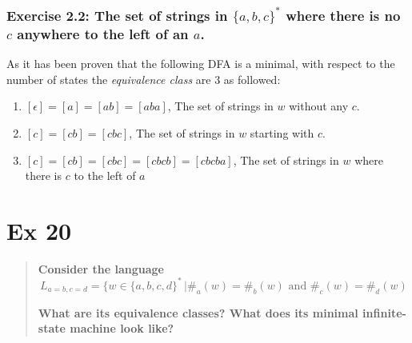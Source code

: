 \documentclass[titlepage]{article}\usepackage[]{graphicx}\usepackage[]{color}
\begin{document}
\subsubsection{Exercise 2.2: The set of strings in $\{a, b, c\}^*$ where there is no $c$ anywhere to the left of an $a$.}
As it has been proven that the following DFA is a minimal, with respect to the number of states the \textit{equivalence class} are 3 as followed:


\begin{enumerate}
  \item $[\epsilon] = [a] = [ab] = [aba]$, The set of strings in $w$ without any $c$.
  \item $[c] = [cb] = [cbc]$, The set of strings in $w$ starting with $c$.
  \item $[c] = [cb] = [cbc] = [cbcb] = [cbcba]$, The set of strings in $w$ where there is $c$ to the left of $a$
\end{enumerate}

\vspace{1cm}




\section*{Ex 20}
\begin{quote}
  \textbf{Consider the language}
  \[ L_{a=b,c=d } = \{ w \in \{a,b, c ,d \}^* \, | \#_a (w) = \#_b (w) \text{ and }
    \#_c (w) = \#_d (w )
  \]
  
\textbf{What are its equivalence classes? What does its minimal infinite-state machine
look like?}
\end{quote}
\end{document}
